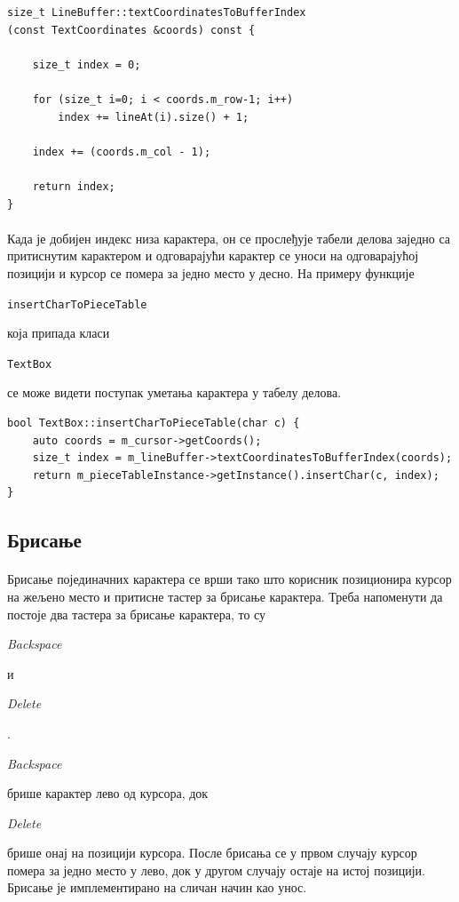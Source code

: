 \documentclass[12pt,oneside]{memoir}
\begin{document}
\begin{verbatim}
size_t LineBuffer::textCoordinatesToBufferIndex
(const TextCoordinates &coords) const {
		
	size_t index = 0;
	
	for (size_t i=0; i < coords.m_row-1; i++)
		index += lineAt(i).size() + 1;
	
	index += (coords.m_col - 1);
	
	return index;
}
\end{verbatim}

\paragraph{}
Када је добијен индекс низа карактера, он се прослеђује табели делова заједно са  притиснутим карактером и одговарајући карактер се уноси на одговарајућој позицији и курсор се помера за једно место у десно. 
На примеру функције 
\begin{latinica}\verb|insertCharToPieceTable|\end{latinica} која припада класи
\begin{latinica}\verb|TextBox|\end{latinica} се може видети поступак уметања
карактера у табелу делова.

\begin{verbatim}
bool TextBox::insertCharToPieceTable(char c) {
	auto coords = m_cursor->getCoords();
	size_t index = m_lineBuffer->textCoordinatesToBufferIndex(coords);
	return m_pieceTableInstance->getInstance().insertChar(c, index);
}
\end{verbatim}


\subsection{Брисање}
\paragraph{}
Брисање појединачних карактера се врши тако што корисник позиционира курсор
на жељено место и притисне тастер за брисање карактера. Треба напоменути да 
постоје два тастера за брисање карактера, то су \begin{latinica}\textit{Backspace}\end{latinica}
и \begin{latinica}\textit{Delete}\end{latinica}.
\begin{latinica}\textit{Backspace}\end{latinica} брише карактер лево од курсора,
док \begin{latinica}\textit{Delete}\end{latinica} брише онај на позицији курсора.
После брисања се у првом случају курсор помера за једно место у лево, док у другом
случају остаје на истој позицији. Брисање је имплементирано на сличан начин као унос.
\end{document}
